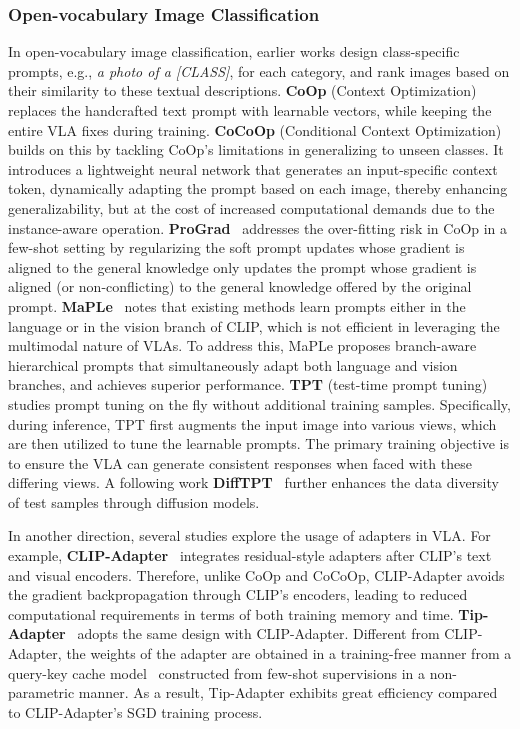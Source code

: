 \subsubsection{Open-vocabulary Image Classification}

In open-vocabulary image classification, earlier works design class-specific prompts, e.g., \emph{a photo of a [CLASS]}, for each category, and rank images based on their similarity to these textual descriptions. \textbf{CoOp} (Context Optimization)~\cite{zhou2022learning} replaces the handcrafted text prompt with learnable vectors, while keeping the entire VLA fixes during training. \textbf{CoCoOp} (Conditional Context Optimization)~\cite{zhou2022conditional} builds on this by tackling CoOp's limitations in generalizing to unseen classes. It introduces a lightweight neural network that generates an input-specific context token, dynamically adapting the prompt based on each image, thereby enhancing generalizability, but at the cost of increased computational demands due to the instance-aware operation.
\textbf{ProGrad}~\cite{zhu2023prompt} addresses the over-fitting risk in CoOp in a few-shot setting by regularizing the soft prompt updates whose gradient is aligned to the general knowledge
only updates the prompt whose gradient is aligned (or non-conflicting) to the general knowledge offered by the original prompt.
\textbf{MaPLe}~\cite{khattak2023maple} notes that existing methods learn prompts either in
the language or in the vision branch of CLIP, which is not efficient in leveraging the multimodal nature of VLAs. To address this, MaPLe proposes branch-aware hierarchical prompts that simultaneously adapt both language and vision branches, and achieves superior performance.
\textbf{TPT} (test-time prompt tuning)~\cite{shu2022test} studies prompt tuning on the fly without additional training samples. Specifically, during inference, TPT first augments the input image into various views, which are then utilized to tune the learnable prompts. The primary training objective is to ensure the VLA can generate consistent responses when faced with these differing views. A following work \textbf{DiffTPT}~\cite{feng2023diverse} further enhances the data diversity of test samples through diffusion models.

In another direction, several studies explore the usage of adapters in VLA. For example, \textbf{CLIP-Adapter}~\cite{gao2023clip} integrates residual-style adapters after CLIP’s text and visual encoders. Therefore, unlike CoOp and CoCoOp, CLIP-Adapter avoids the gradient backpropagation through CLIP’s encoders, leading to reduced computational requirements in terms of both training memory and time. \textbf{Tip-Adapter}~\cite{zhang2021tip} adopts the same design with CLIP-Adapter. Different from CLIP-Adapter, the weights of the adapter are obtained in a training-free manner from a query-key cache model~\cite{orhan2018simple,grave2017unbounded} constructed from few-shot supervisions in a non-parametric manner. As a result, Tip-Adapter exhibits great efficiency compared to CLIP-Adapter’s SGD training process.



